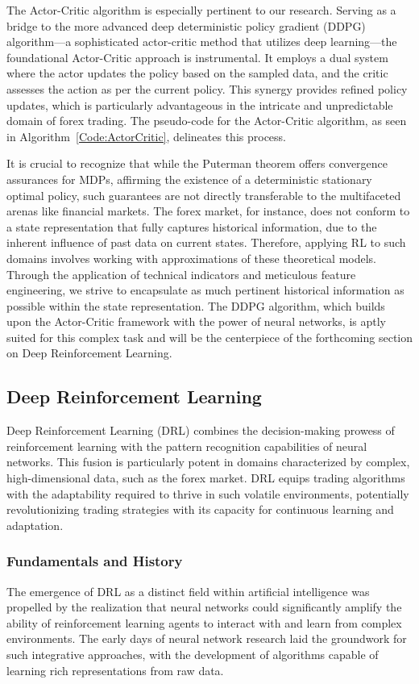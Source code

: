 The Actor-Critic algorithm is especially pertinent to our research. Serving as a bridge to the more advanced deep deterministic policy gradient (DDPG) algorithm—a sophisticated actor-critic method that utilizes deep learning—the foundational Actor-Critic approach is instrumental. It employs a dual system where the actor updates the policy based on the sampled data, and the critic assesses the action as per the current policy. This synergy provides refined policy updates, which is particularly advantageous in the intricate and unpredictable domain of forex trading. The pseudo-code for the Actor-Critic algorithm, as seen in Algorithm~\ref{Code:ActorCritic}, delineates this process.



It is crucial to recognize that while the Puterman theorem offers convergence assurances for MDPs, affirming the existence of a deterministic stationary optimal policy, such guarantees are not directly transferable to the multifaceted arenas like financial markets. The forex market, for instance, does not conform to a state representation that fully captures historical information, due to the inherent influence of past data on current states. Therefore, applying RL to such domains involves working with approximations of these theoretical models. Through the application of technical indicators and meticulous feature engineering, we strive to encapsulate as much pertinent historical information as possible within the state representation. The DDPG algorithm, which builds upon the Actor-Critic framework with the power of neural networks, is aptly suited for this complex task and will be the centerpiece of the forthcoming section on Deep Reinforcement Learning.

\subsection{Deep Reinforcement Learning}

Deep Reinforcement Learning (DRL) combines the decision-making prowess of reinforcement learning with the pattern recognition capabilities of neural networks. This fusion is particularly potent in domains characterized by complex, high-dimensional data, such as the forex market. DRL equips trading algorithms with the adaptability required to thrive in such volatile environments, potentially revolutionizing trading strategies with its capacity for continuous learning and adaptation.

\subsubsection{Fundamentals and History}
The emergence of DRL as a distinct field within artificial intelligence was propelled by the realization that neural networks could significantly amplify the ability of reinforcement learning agents to interact with and learn from complex environments. The early days of neural network research laid the groundwork for such integrative approaches, with the development of algorithms capable of learning rich representations from raw data.

